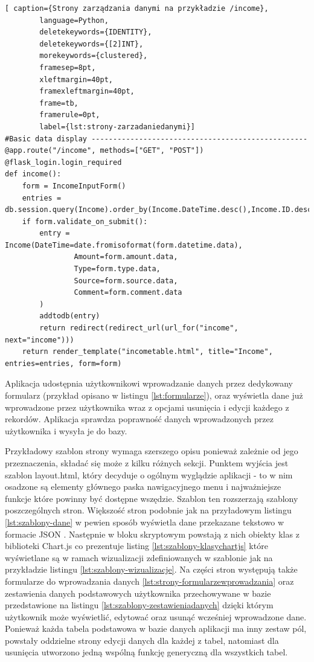 \documentclass[a4paper,10pt, twoside]{report}
\begin{document}
\begin{large}
\begin{minipage}{\textwidth}
    \begin{lstlisting}[ caption={Strony zarządzania danymi na przykładzie /income},
        language=Python,
        deletekeywords={IDENTITY},
        deletekeywords={[2]INT},
        morekeywords={clustered},
        framesep=8pt,
        xleftmargin=40pt,
        framexleftmargin=40pt,
        frame=tb,
        framerule=0pt,
        label={lst:strony-zarzadaniedanymi}]
#Basic data display --------------------------------------------------
@app.route("/income", methods=["GET", "POST"])
@flask_login.login_required
def income():
    form = IncomeInputForm()
    entries = db.session.query(Income).order_by(Income.DateTime.desc(),Income.ID.desc()).all()
    if form.validate_on_submit():
        entry = Income(DateTime=date.fromisoformat(form.datetime.data),
                Amount=form.amount.data,
                Type=form.type.data,
                Source=form.source.data,
                Comment=form.comment.data
        )
        addtodb(entry)
        return redirect(redirect_url(url_for("income", next="income")))
    return render_template("incometable.html", title="Income", entries=entries, form=form)\end{lstlisting}
{Aplikacja udostępnia użytkownikowi wprowadzanie danych przez dedykowany 
formularz (przykład opisano w listingu \ref*{lst:formularze}), oraz wyświetla 
dane już wprowadzone przez użytkownika wraz z opcjami usunięcia i edycji każdego
 z rekordów. Aplikacja sprawdza poprawność danych wprowadzonych przez 
użytkownika i wysyła je do bazy.}
\end{minipage}

{Przykładowy szablon strony wymaga szerszego opisu ponieważ zależnie od jego 
przeznaczenia, składać się może z kilku różnych sekcji. Punktem wyjścia jest 
szablon layout.html, który decyduje o ogólnym wyglądzie aplikacji - to w nim 
osadzone są elementy głównego paska nawigacyjnego menu i najważniejsze funkcje 
które powinny być dostępne wszędzie. Szablon ten rozszerzają szablony 
poszczególnych stron. Większość stron podobnie jak na przyładowym listingu 
\ref*{lst:szablony-dane} w pewien sposób wyświetla dane przekazane tekstowo w 
formacie JSON \cite{JSON}. Następnie w bloku skryptowym powstają z nich obiekty 
klas z biblioteki Chart.js \cite{chart.js} co prezentuje listing 
\ref*{lst:szablony-klasychartjs} które wyświetlane są w ramach wizualizacji 
zdefiniowanych w szablonie jak na przykładzie listingu 
\ref*{lst:szablony-wizualizacje}. Na części stron występują także formularze do 
wprowadzania danych \ref*{lst:strony-formularzewprowadzania} oraz zestawienia 
danych podstawowych użytkownika przechowywane w bazie przedstawione na listingu 
\ref*{lst:szablony-zestawieniadanych} dzięki którym użytkownik może wyświetlić, 
edytować oraz usunąć wcześniej wprowadzone dane. Ponieważ każda tabela 
podstawowa w bazie danych aplikacji ma inny zestaw pól, powstały oddzielne 
strony edycji danych dla każdej z tabel, natomiast dla usunięcia utworzono 
jedną wspólną funkcję generyczną dla wszystkich tabel.}


\end{large}
\end{document}
